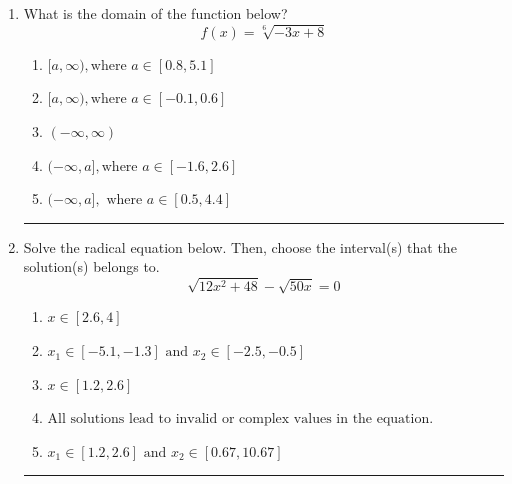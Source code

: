 \documentclass[14pt]{extbook}
\newcommand{\litem}[1]{\item#1\hspace*{-1cm}\rule{\textwidth}{0.4pt}}
\begin{document}
\begin{enumerate}
{\begin{enumerate}[label=\Alph*.]
\end{enumerate} }
\litem{
What is the domain of the function below?\[ f(x) = \sqrt[6]{-3 x + 8} \]\begin{enumerate}[label=\Alph*.]
\item \( [a, \infty), \text{where } a \in [0.8, 5.1] \)
\item \( [a, \infty), \text{where } a \in [-0.1, 0.6] \)
\item \( (-\infty, \infty) \)
\item \( (-\infty, a], \text{where } a \in [-1.6, 2.6] \)
\item \( (-\infty, a], \text{ where } a \in [0.5, 4.4] \)

\end{enumerate} }
\litem{
Solve the radical equation below. Then, choose the interval(s) that the solution(s) belongs to.\[ \sqrt{12 x^2 + 48} - \sqrt{50 x} = 0 \]\begin{enumerate}[label=\Alph*.]
\item \( x \in [2.6,4] \)
\item \( x_1 \in [-5.1, -1.3] \text{ and } x_2 \in [-2.5,-0.5] \)
\item \( x \in [1.2,2.6] \)
\item \( \text{All solutions lead to invalid or complex values in the equation.} \)
\item \( x_1 \in [1.2, 2.6] \text{ and } x_2 \in [0.67,10.67] \)


\end{enumerate}}
\end{enumerate}
\end{document}
